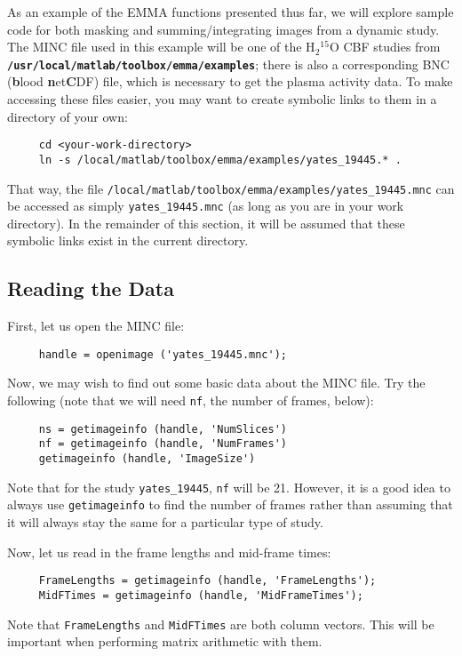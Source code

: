 \documentclass[11pt]{article}
\def\code#1{{\tt \bf #1}}
\begin{document}
As an example of the EMMA functions presented thus far, we will
explore sample code for both masking and summing/integrating images
from a dynamic study.  The MINC file used in this example will be one
of the H$_2$$^{15}$O CBF studies from
\code{/usr/local/matlab/toolbox/emma/examples}; there is also a
corresponding BNC ({\bf b}lood {\bf n}et{\bf C}DF) file, which is
necessary to get the plasma activity data.  To make accessing
these files easier, you may want to create symbolic links to them in a
directory of your own:
\begin{verbatim}
     cd <your-work-directory>
     ln -s /local/matlab/toolbox/emma/examples/yates_19445.* .
\end{verbatim}
That way, the file
\verb|/local/matlab/toolbox/emma/examples/yates_19445.mnc| can be
accessed as simply \verb|yates_19445.mnc| (as long as you are in your
work directory).  In the remainder of this section, it will be assumed
that these symbolic links exist in the current directory.

\subsection{Reading the Data}

First, let us open the MINC file:
\begin{verbatim}
     handle = openimage ('yates_19445.mnc');
\end{verbatim}
Now, we may wish to find out some basic data about the MINC file.  Try
the following (note that we will need \verb|nf|, the number of frames,
below):
\begin{verbatim}
     ns = getimageinfo (handle, 'NumSlices')
     nf = getimageinfo (handle, 'NumFrames')
     getimageinfo (handle, 'ImageSize')
\end{verbatim}
Note that for the study \verb|yates_19445|, \verb|nf| will be 21.
However, it is a good idea to always use \verb|getimageinfo| to find
the number of frames rather than assuming that it will always stay the
same for a particular type of study.

Now, let us read in the frame lengths and mid-frame times:
\begin{verbatim}
     FrameLengths = getimageinfo (handle, 'FrameLengths');
     MidFTimes = getimageinfo (handle, 'MidFrameTimes');
\end{verbatim}
Note that \verb|FrameLengths| and \verb|MidFTimes| are both column
vectors.  This will be important when performing matrix arithmetic
with them.
\end{document}
